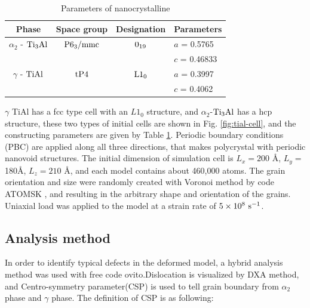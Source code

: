 \documentclass[Unknown,article,submit,moreauthors,pdftex,10pt,a4paper]{Definitions/mdpi}
\begin{document}
\begin{table}[ht]
	\caption{Parameters of nanocrystalline}
	\centering
	\begin{tabular}{c c c l}
	\toprule
	\textbf{Phase}			& {Space group}		& {Designation} 		& {Parameters} \\
	\midrule
	$\alpha_2$ - $\rm{Ti_3Al}$		& $\rm P6_3/mmc$ 	& $\rm 0_{19}$ 		& $a$ = 0.5765 \\
		&					&					& $c$ = 0.46833 \\
	$\gamma$ - $\rm{TiAl}$ 		& $\rm tP4$ 		& $\rm L1_0$		& $a$ = 0.3997 \\
		&					&					& $c$ = 0.4062 \\			
	\bottomrule
	\end{tabular} 
	\label{tab:lattice_parameter}
\end{table} 

$\gamma $ TiAl has a fcc type cell with an $L1_0$ structure, and $\alpha_2$-$\rm Ti_3Al$ has a hcp structure, these two types of initial cells are shown in Fig. \ref{fig:tial-cell}, and the constructing parameters are given by Table \ref{tab:lattice_parameter}. Periodic boundary conditions (PBC) are applied along all three directions, that makes polycrystal with periodic nanovoid structures. The initial dimension of simulation cell is $L_x =200$ \si{\angstrom}, $L_y = $180\si{\angstrom}, $L_z = 210$ \si{\angstrom}, and each model contains about 460,000 atoms. The grain orientation and size were randomly created with Voronoi method by code ATOMSK \cite{Hirel2015}, and resulting in the arbitrary shape and orientation of the grains. Uniaxial load was applied to the model at a strain rate of $5\times10^8\ \rm{s}^{-1}$. 
\subsection{Analysis method}
In order to identify typical defects in the deformed model, a hybrid analysis method was used with free code ovito\cite{Stukowski2010a}.Dislocation is visualized by DXA method, and Centro-symmetry parameter(CSP) is used to tell grain boundary from  $\alpha_2$ phase and $\gamma$ phase. The definition of CSP is as following:
\end{document}
